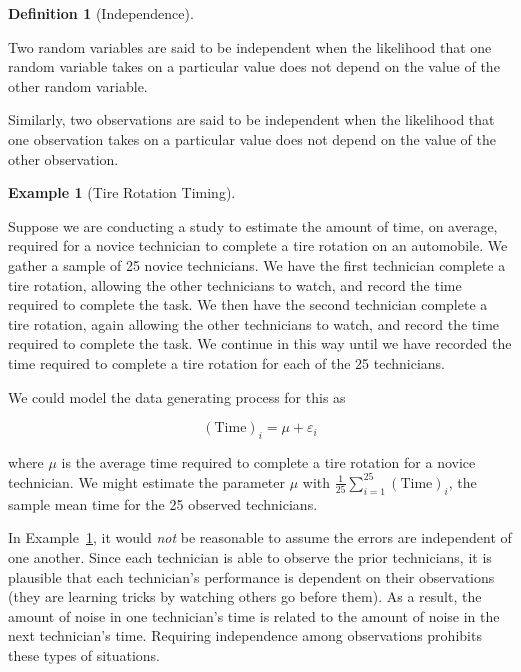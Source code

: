 \documentclass[
  letterpaper,
  DIV=11,
  numbers=noendperiod]{scrreprt}
\theoremstyle{definition}
\newtheorem{definition}{Definition}[chapter]
\theoremstyle{definition}
\newtheorem{example}{Example}[chapter]
\theoremstyle{plain}
\theoremstyle{remark}
\begin{document}
\begin{definition}[Independence]\protect\hypertarget{def-independence}{}\label{def-independence}

Two random variables are said to be independent when the likelihood that
one random variable takes on a particular value does not depend on the
value of the other random variable.

Similarly, two observations are said to be independent when the
likelihood that one observation takes on a particular value does not
depend on the value of the other observation.

\end{definition}

\begin{example}[Tire Rotation
Timing]\protect\hypertarget{exm-tire-rotation}{}\label{exm-tire-rotation}

Suppose we are conducting a study to estimate the amount of time, on
average, required for a novice technician to complete a tire rotation on
an automobile. We gather a sample of 25 novice technicians. We have the
first technician complete a tire rotation, allowing the other
technicians to watch, and record the time required to complete the task.
We then have the second technician complete a tire rotation, again
allowing the other technicians to watch, and record the time required to
complete the task. We continue in this way until we have recorded the
time required to complete a tire rotation for each of the 25
technicians.

We could model the data generating process for this as

\[(\text{Time})_i = \mu + \varepsilon_i\]

where \(\mu\) is the average time required to complete a tire rotation
for a novice technician. We might estimate the parameter \(\mu\) with
\(\frac{1}{25}\sum_{i=1}^{25} (\text{Time})_i\), the sample mean time
for the 25 observed technicians.

\end{example}

In Example~\ref{exm-tire-rotation}, it would \emph{not} be reasonable to
assume the errors are independent of one another. Since each technician
is able to observe the prior technicians, it is plausible that each
technician's performance is dependent on their observations (they are
learning tricks by watching others go before them). As a result, the
amount of noise in one technician's time is related to the amount of
noise in the next technician's time. Requiring independence among
observations prohibits these types of situations.
\end{document}
